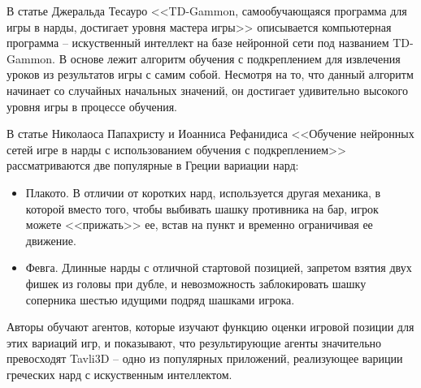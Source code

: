 В статье Джеральда Тесауро <<TD-Gammon, самообучающаяся программа для игры в нарды, достигает уровня мастера игры>> \cite{annotationtdgammon} описывается компьютерная программа -- искуственный интеллект на базе нейронной сети под названием TD-Gammon. В основе лежит алгоритм обучения с подкреплением для извлечения уроков из результатов игры с самим собой. Несмотря на то, что данный алгоритм начинает со случайных начальных значений, он достигает удивительно высокого уровня игры в процессе обучения.

В статье Николаоса Папахристу и Иоанниса Рефанидиса <<Обучение нейронных сетей игре в нарды с использованием обучения с подкреплением>> \cite{annotationavli3d} рассматриваются две популярные в Греции вариации нард:
\begin{itemize}
    \item Плакото. В отличии от коротких нард, используется другая механика, в которой вместо того, чтобы выбивать шашку противника на бар, игрок можете <<прижать>> ее, встав на пункт и временно ограничивая ее движение.
    \item Февга. Длинные нарды с отличной стартовой позицией, запретом взятия двух фишек из головы при дубле, и невозможность заблокировать шашку соперника шестью идущими подряд шашками игрока.
\end{itemize}

Авторы обучают агентов, которые изучают функцию оценки игровой позиции для этих вариаций игр, и показывают, что результирующие агенты значительно превосходят Tavli3D -- одно из популярных приложений, реализующее вариции греческих нард с искуственным интеллектом.

